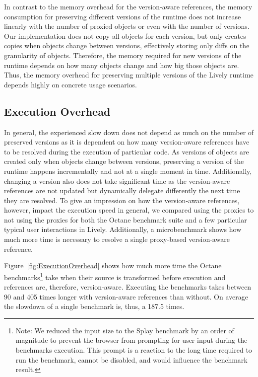 In contrast to the memory overhead for the version-aware references, the memory consumption for preserving different versions of the runtime does not increase linearly with the number of proxied objects or even with the number of versions.
Our implementation does not copy all objects for each version, but only creates copies when objects change between versions, effectively storing only diffs on the granularity of objects.
Therefore, the memory required for new versions of the runtime depends on how many objects change and how big those objects are.
Thus, the memory overhead for preserving multiple versions of the Lively runtime depends highly on concrete usage scenarios.


\subsection{Execution Overhead}


In general, the experienced slow down does not depend as much on the number of preserved versions as it is dependent on how many version-aware references have to be resolved during the execution of particular code.
As versions of objects are created only when objects change between versions, preserving a version of the runtime happens incrementally and not at a single moment in time.
Additionally, changing a version also does not take significant time as the version-aware references are not updated but dynamically delegate differently the next time they are resolved.
To give an impression on how the version-aware references, however, impact the execution speed in general, we compared using the proxies to not using the proxies for both the Octane benchmark suite and a few particular typical user interactions in Lively.
Additionally, a microbenchmark shows how much more time is necessary to resolve a single proxy-based version-aware reference.

Figure~\ref{fig:ExecutionOverhead} shows how much more time the Octane benchmarks\footnote{Note: We reduced the input size to the Splay benchmark by an order of magnitude to prevent the browser from prompting for user input during the benchmarks execution. This prompt is a reaction to the long time required to run the benchmark, cannot be disabled, and would influence the benchmark result.} take when their source is transformed before execution and references are, therefore, version-aware.
Executing the benchmarks takes between 90 and 405 times longer with version-aware references than without.
On average the slowdown of a single benchmark is, thus, a 187.5 times.

